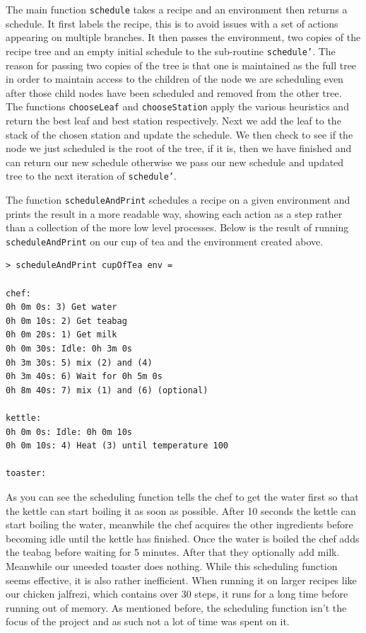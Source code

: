 \documentclass[11pt]{article}
\begin{document}
The main function \texttt{schedule} takes a recipe and an environment then returns a schedule.
It first labels the recipe, this is to avoid issues with a set of actions appearing on multiple
branches. It then passes the environment, two copies of the recipe tree and an empty initial
schedule to the sub-routine \texttt{schedule'}. The reason for passing two copies of the tree
is that one is maintained as the full tree in order to maintain access to the children of the
node we are scheduling even after those child nodes have been scheduled and removed from the other
tree. The functions \texttt{chooseLeaf} and \texttt{chooseStation} apply the various heuristics
and return the best leaf and best station respectively. Next we add the leaf to the stack of
the chosen station and update the schedule. We then check to see if the node we just
scheduled is the root of the tree, if it is, then we have finished and can return our new schedule
otherwise we pass our new schedule and updated tree to the next iteration of \texttt{schedule'}.

\medbreak

The function \texttt{scheduleAndPrint} schedules a recipe on a given environment
and prints the result in a more readable way, showing each action as a step rather
than a collection of the more low level processes. Below is the result of running
\texttt{scheduleAndPrint} on our cup of tea and the environment created above.

\begin{lstlisting}
> scheduleAndPrint cupOfTea env = 

chef:
0h 0m 0s: 3) Get water
0h 0m 10s: 2) Get teabag
0h 0m 20s: 1) Get milk
0h 0m 30s: Idle: 0h 3m 0s
0h 3m 30s: 5) mix (2) and (4)
0h 3m 40s: 6) Wait for 0h 5m 0s
0h 8m 40s: 7) mix (1) and (6) (optional)

kettle:
0h 0m 0s: Idle: 0h 0m 10s
0h 0m 10s: 4) Heat (3) until temperature 100

toaster:
\end{lstlisting}

As you can see the scheduling function tells the chef to get the water first so that the
kettle can start boiling it as soon as possible. After 10 seconds the kettle can start
boiling the water, meanwhile the chef acquires the other ingredients before becoming idle
until the kettle has finished. Once the water is boiled the chef adds the teabag before
waiting for 5 minutes. After that they optionally add milk. Meanwhile our uneeded toaster
does nothing. While this scheduling function seems effective, it is also rather inefficient.
When running it on larger recipes like our chicken jalfrezi, which contains over 30 steps,
it runs for a long time before running out of memory. As mentioned before, the scheduling
function isn't the focus of the project and as such not a lot of time was spent on it.
\end{document}
